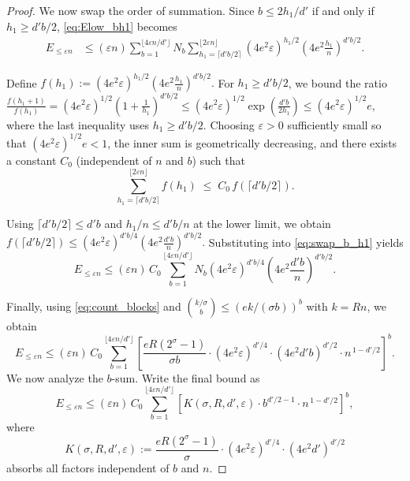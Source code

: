 \begin{proof}
We now swap the order of summation. Since $b\le 2h_1/d'$ if and only if
$h_1\ge d'b/2$, \eqref{eq:Elow_bh1} becomes
\begin{align}
E_{\le \varepsilon n}
&\le
(\varepsilon n)
\sum_{b=1}^{\lfloor 4\varepsilon n/d'\rfloor}
N_b
\sum_{h_1=\lceil d'b/2\rceil}^{\lfloor 2\varepsilon n\rfloor}
\left(4e^2\varepsilon\right)^{h_1/2}
\left(4e^2\frac{h_1}{n}\right)^{d'b/2}.
\label{eq:swap_b_h1}
\end{align}

Define
$
f(h_1)
:=
\left(4e^2\varepsilon\right)^{h_1/2}
\left(4e^2\frac{h_1}{n}\right)^{d'b/2}.
$
For $h_1\ge d'b/2$, we bound the ratio
$
\frac{f(h_1+1)}{f(h_1)}
=
(4e^2\varepsilon)^{1/2}
\left(1+\frac{1}{h_1}\right)^{d'b/2}
\le
(4e^2\varepsilon)^{1/2}
\exp\!\left(\frac{d'b}{2h_1}\right)
\le
(4e^2\varepsilon)^{1/2}e,
$
where the last inequality uses $h_1\ge d'b/2$.
Choosing $\varepsilon>0$ sufficiently small so that
$(4e^2\varepsilon)^{1/2}e<1$, the inner sum is geometrically decreasing,
and there exists a constant $C_0$ (independent of $n$ and $b$) such that
\begin{equation}
\label{eq:h1_tail_by_first}
\sum_{h_1=\lceil d'b/2\rceil}^{\lfloor 2\varepsilon n\rfloor} f(h_1)
\;\le\;
C_0\, f(\lceil d'b/2\rceil).
\end{equation}

Using $\lceil d'b/2\rceil\le d'b$ and $h_1/n\le d'b/n$ at the lower limit,
we obtain
$
f(\lceil d'b/2\rceil)
\le
\left(4e^2\varepsilon\right)^{d'b/4}
\left(4e^2\frac{d'b}{n}\right)^{d'b/2}.
$
Substituting into \eqref{eq:swap_b_h1} yields
\begin{equation}
\label{eq:Elow_after_h1}
E_{\le \varepsilon n}
\le
(\varepsilon n)\,C_0
\sum_{b=1}^{\lfloor 4\varepsilon n/d'\rfloor}
N_b
\left(4e^2\varepsilon\right)^{d'b/4}
\left(4e^2\frac{d'b}{n}\right)^{d'b/2}.
\end{equation}

Finally, using \eqref{eq:count_blocks} and
$\binom{k/\sigma}{b}\le (e k/(\sigma b))^b$ with $k=Rn$, we obtain
\[
E_{\le \varepsilon n}
\le
(\varepsilon n)\,C_0
\sum_{b=1}^{\lfloor 4\varepsilon n/d'\rfloor}
\left[
\frac{eR(2^\sigma-1)}{\sigma b}
\cdot
\left(4e^2\varepsilon\right)^{d'/4}
\cdot
\left(4e^2 d' b\right)^{d'/2}
\cdot
n^{\,1-d'/2}
\right]^b.
\]
We now analyze the $b$-sum.  Write the final bound as
\[
E_{\le \varepsilon n}
\le
(\varepsilon n)\,C_0
\sum_{b=1}^{\lfloor 4\varepsilon n/d'\rfloor}
\left[
K(\sigma,R,d',\varepsilon)\cdot b^{d'/2-1}\cdot n^{\,1-d'/2}
\right]^b,
\]
where
\[
K(\sigma,R,d',\varepsilon)
:=
\frac{eR(2^\sigma-1)}{\sigma}\cdot
\left(4e^2\varepsilon\right)^{d'/4}\cdot
\left(4e^2 d'\right)^{d'/2}
\]
absorbs all factors independent of $b$ and $n$.


\end{proof}
